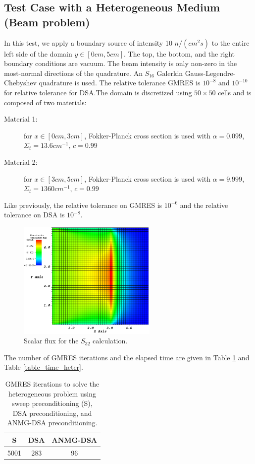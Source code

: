 \subsection{Test Case with a Heterogeneous Medium (Beam problem)}
In this test, we apply a boundary source of intensity 10 $n/(cm^2 s)$ to the
entire left side of the domain $y \in [0cm,5cm]$. The top, the bottom, 
and the right boundary conditions are vacuum. The beam intensity is only 
non-zero in the most-normal directions of the quadrature. An $S_{16}$ Galerkin 
Gauss-Legendre-Chebyshev quadrature is used. The relative tolerance GMRES is
$10^{-8}$ and $10^{-10}$ for relative tolerance for DSA.The domain
is discretized using $50 \times 50$ cells and is composed of two materials:
\begin{description}
  \item[Material 1:] for $x\in [0cm,3cm]$, Fokker-Planck cross section is used with 
    $\alpha=0.099$, $\Sigma_t = 13.6 cm^{-1}$, $c=0.99$
  \item[Material 2:] for $x\in [3cm,5cm]$, Fokker-Planck cross section is used with 
    $\alpha=9.999$, $\Sigma_t = 1360 cm^{-1}$, $c=0.99$
\end{description}
Like previously, the relative tolerance on GMRES is $10^{-6}$ and the relative
tolerance on DSA is $10^{-8}$. 
\begin{figure}[H]
  \centering
  \includegraphics[width=0.6\textwidth]{Anmg/heterog_anmg_crop}
  \caption{Scalar flux for the $S_{32}$ calculation.}
\end{figure}
The number of GMRES iterations and the elapsed 
time are given in Table \ref{table_gmres_heter} and Table \ref{table_time_heter}.
\begin{table}[H]
  \begin{center}
    \caption{GMRES iterations to solve the heterogeneous problem using sweep
    preconditioning (S), DSA preconditioning, and ANMG-DSA preconditioning.}
    \begin{tabular}{|c|c|c|}
      \hline
      S & DSA & ANMG-DSA \\
      \hline
      5001 & 283 & 96 \\
      \hline
    \end{tabular}
    \label{table_gmres_heter}
  \end{center}
\end{table}
